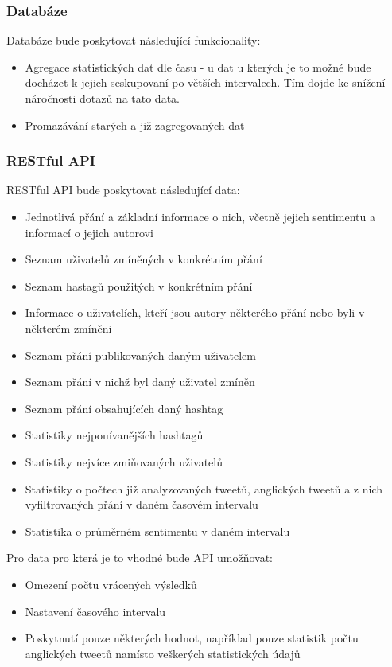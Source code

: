 \documentclass[thesis=B,czech]{FITthesis}[2012/06/26]
\begin{document}
\subsubsection{Databáze}
 Databáze bude poskytovat následující funkcionality:
\begin{itemize}
\item Agregace statistických dat dle času - u dat u kterých je to možné bude docházet k jejich seskupovaní po větších intervalech. Tím dojde ke snížení náročnosti dotazů na tato data. 
\item Promazávání starých a již zagregovaných dat
\end{itemize}
\subsubsection{RESTful API}
RESTful API bude poskytovat následující data:

\begin{itemize}
\item Jednotlivá přání a základní informace o nich, včetně jejich sentimentu a informací o jejich autorovi
\item Seznam uživatelů zmíněných v konkrétním přání
\item Seznam hastagů použitých v konkrétním přání
\item Informace o uživatelích, kteří jsou autory některého přání nebo byli v některém zmíněni
\item Seznam přání publikovaných daným uživatelem
\item Seznam přání v nichž byl daný uživatel zmíněn
\item Seznam přání obsahujících daný hashtag
\item Statistiky nejpouívanějších hashtagů
\item Statistiky nejvíce zmiňovaných uživatelů
\item Statistiky o počtech již analyzovaných tweetů, anglických tweetů a z nich vyfiltrovaných přání v daném časovém intervalu
\item Statistika o průměrném sentimentu v daném intervalu
\end{itemize}

\noindent Pro data pro která je to vhodné bude API umožňovat:
\begin{itemize}
\item Omezení počtu vrácených výsledků
\item Nastavení časového intervalu
\item Poskytnutí pouze některých hodnot, například pouze statistik počtu anglických tweetů namísto veškerých statistických údajů
\end{itemize}
\end{document}
